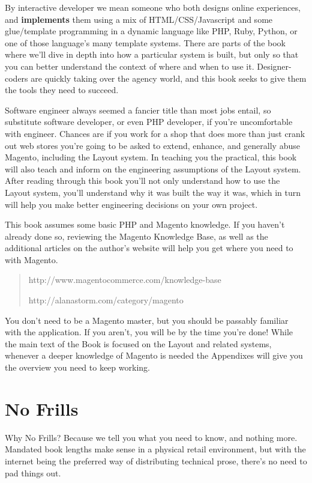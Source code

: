\documentclass[oneside]{book}
\begin{document}
By interactive developer we mean someone who both designs online experiences, and \textbf{implements} them using a mix of HTML/CSS/Javascript and some glue/template programming in a dynamic language like PHP, Ruby, Python, or one of those language's many template systems.  There are parts of the book where we'll dive in depth into how a particular system is built, but only so that you can better understand the context of where and when to use it.  Designer-coders are quickly taking over the agency world, and this book seeks to give them the tools they need to succeed.

Software engineer always seemed a fancier title than most jobs entail, so substitute software developer, or even PHP developer, if you're uncomfortable with engineer.  Chances are if you work for a shop that does more than just crank out web stores you're going to be asked to extend, enhance, and generally abuse Magento, including the Layout system.  In teaching you the practical, this book will also teach and inform on the engineering assumptions of the Layout system.  After reading through this book you'll not only understand how to use the Layout system, you'll understand why it was built the way it was, which in turn will help you make better engineering decisions on your own project.

This book assumes some basic PHP and Magento knowledge.  If you haven't already done so, reviewing the Magento Knowledge Base, as well as the additional articles on the author's website will help you get where you need to with Magento.

\begin{quote}
http://www.magentocommerce.com/knowledge-base

  http://alanastorm.com/category/magento
\end{quote}

You don't need to be a Magento master, but you should be passably familiar with the application.  If you aren't, you will be by the time you're done!  While the main text of the Book is focused on the Layout and related systems, whenever a deeper knowledge of Magento is needed the Appendixes will give you the overview you  need to keep working.

\section{No Frills}

Why No Frills?  Because we tell you what you need to know, and nothing more.  Mandated book lengths make sense in a physical retail environment, but with the internet being the preferred way of distributing technical prose, there's no need to pad things out.
\end{document}
